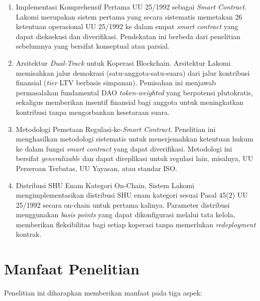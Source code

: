 \begin{enumerate}
	\item Implementasi Komprehensif Pertama UU 25/1992 sebagai \textit{Smart Contract}. Lakomi merupakan sistem pertama yang secara sistematis memetakan 26 ketentuan operasional UU 25/1992 ke dalam empat \textit{smart contract} yang dapat dieksekusi dan diverifikasi. Pendekatan ini berbeda dari penelitian sebelumnya yang bersifat konseptual atau parsial.
	
	\item Arsitektur \textit{Dual-Track} untuk Koperasi Blockchain. Arsitektur Lakomi memisahkan jalur demokrasi (satu-anggota-satu-suara) dari jalur kontribusi finansial (\textit{tier} LTV berbasis simpanan). Pemisahan ini menjawab permasalahan fundamental DAO \textit{token-weighted} yang berpotensi plutokratis, sekaligus memberikan insentif finansial bagi anggota untuk meningkatkan kontribusi tanpa mengorbankan kesetaraan suara.
	
	\item Metodologi Pemetaan Regulasi-ke-\textit{Smart Contract}. Penelitian ini menghasilkan metodologi sistematis untuk menerjemahkan ketentuan hukum ke dalam fungsi \textit{smart contract} yang dapat diverifikasi. Metodologi ini bersifat \textit{generalizable} dan dapat direplikasi untuk regulasi lain, misalnya, UU Perseroan Terbatas, UU Yayasan, atau standar ISO.
	
	\item Distribusi SHU Enam Kategori On-Chain. Sistem Lakomi mengimplementasikan distribusi SHU enam kategori sesuai Pasal 45(2) UU 25/1992 secara on-chain untuk pertama kalinya. Parameter distribusi menggunakan \textit{basis points} yang dapat dikonfigurasi melalui tata kelola, memberikan fleksibilitas bagi setiap koperasi tanpa memerlukan \textit{redeployment} kontrak.
\end{enumerate}

\section{Manfaat Penelitian}

Penelitian ini diharapkan memberikan manfaat pada tiga aspek:

